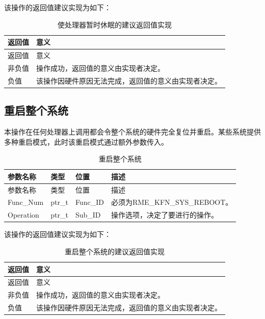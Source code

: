 该操作的返回值建议实现为如下：

\begin{xltabular}{\textwidth}{@{}>{\hsize\raggedright\arraybackslash}X>{\hsize\raggedright\arraybackslash}X@{}}
\caption{使处理器暂时休眠的建议返回值实现}\label{tab:8-44-put-processor-to-sleep-suggested-return-values}\\
\toprule
返回值 & 意义\tabularnewline
\endfirsthead
\toprule
返回值 & 意义\tabularnewline
\midrule
\endhead
\bottomrule
\endlastfoot
    非负值 & 操作成功，返回值的意义由实现者决定。\tabularnewline
    负值 & 该操作因硬件原因无法完成，返回值的意义由实现者决定。\tabularnewline
\end{xltabular}

\subsection{重启整个系统}\label{subsec:8-reboot-system}

本操作在任何处理器上调用都会令整个系统的硬件完全复位并重启。某些系统提供多种重启模式，此时该重启模式通过额外参数传入。

\begin{xltabular}{\textwidth}{@{}>{\hsize\raggedright\arraybackslash}X>{\hsize\raggedright\arraybackslash}X>{\hsize\raggedright\arraybackslash}X>{\hsize\raggedright\arraybackslash}X@{}}
\caption{重启整个系统}\label{tab:8-45-reboot-system}\\
\toprule
参数名称 & 类型 & 位置 & 描述\tabularnewline
\endfirsthead
\toprule
参数名称 & 类型 & 位置 & 描述\tabularnewline
\midrule
\endhead
\bottomrule
\endlastfoot
Func\_Num & ptr\_t & Func\_ID &
必须为RME\_KFN\_SYS\_REBOOT。\tabularnewline
Operation & ptr\_t & Sub\_ID &
操作选项，决定了要进行的操作。\tabularnewline
\end{xltabular}

该操作的返回值建议实现为如下：

\begin{xltabular}{\textwidth}{@{}>{\hsize\raggedright\arraybackslash}X>{\hsize\raggedright\arraybackslash}X@{}}
\caption{重启整个系统的建议返回值实现}\label{tab:8-46-reboot-system-suggested-return-values}\\
\toprule
返回值 & 意义\tabularnewline
\endfirsthead
\toprule
返回值 & 意义\tabularnewline
\midrule
\endhead
\bottomrule
\endlastfoot
    非负值 & 操作成功，返回值的意义由实现者决定。\tabularnewline
    负值 & 该操作因硬件原因无法完成，返回值的意义由实现者决定。\tabularnewline
\end{xltabular}


